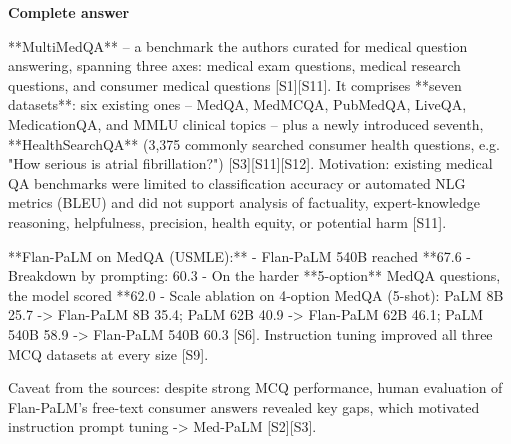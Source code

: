 \documentclass[10pt]{article}
\begin{document}
\textbf{Complete answer}
\begin{AnswerText}
**MultiMedQA** -- a benchmark the authors curated for medical question answering, spanning three axes: medical exam questions, medical research questions, and consumer medical questions [S1][S11]. It comprises **seven datasets**: six existing ones -- MedQA, MedMCQA, PubMedQA, LiveQA, MedicationQA, and MMLU clinical topics -- plus a newly introduced seventh, **HealthSearchQA** (3,375 commonly searched consumer health questions, e.g. "How serious is atrial fibrillation?") [S3][S11][S12]. Motivation: existing medical QA benchmarks were limited to classification accuracy or automated NLG metrics (BLEU) and did not support analysis of factuality, expert-knowledge reasoning, helpfulness, precision, health equity, or potential harm [S11].

**Flan-PaLM on MedQA (USMLE):**
- Flan-PaLM 540B reached **67.6%
- Breakdown by prompting: 60.3%
- On the harder **5-option** MedQA questions, the model scored **62.0%
- Scale ablation on 4-option MedQA (5-shot): PaLM 8B 25.7 -> Flan-PaLM 8B 35.4; PaLM 62B 40.9 -> Flan-PaLM 62B 46.1; PaLM 540B 58.9 -> Flan-PaLM 540B 60.3 [S6]. Instruction tuning improved all three MCQ datasets at every size [S9].

Caveat from the sources: despite strong MCQ performance, human evaluation of Flan-PaLM's free-text consumer answers revealed key gaps, which motivated instruction prompt tuning -> Med-PaLM [S2][S3].
\end{AnswerText}
\end{document}
